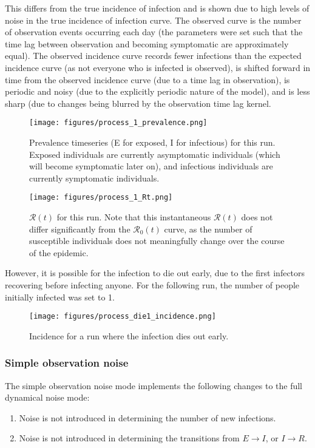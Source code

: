\documentclass{article}
\newcommand{\nR}{\mathcal{R}}
\begin{document}
This differs from the true incidence of infection and is shown due to high levels of noise in the true incidence of infection curve. The observed curve is the number of observation events occurring each day (the parameters were set such that the time lag between observation and becoming symptomatic are approximately equal). The observed incidence curve records fewer infections than the expected incidence curve (as not everyone who is infected is observed), is shifted forward in time from the observed incidence curve (due to a time lag in observation), is periodic and noisy (due to the explicitly periodic nature of the model), and is less sharp (due to changes being blurred by the observation time lag kernel. 

\clearpage
\begin{figure}[h!]
\centering
\texttt{[image: figures/process\_1\_prevalence.png]}
\caption{Prevalence timeseries (E for exposed, I for infectious) for this run. Exposed individuals are currently asymptomatic individuals (which will become symptomatic later on), and infectious individuals are currently symptomatic individuals.}
\end{figure}

\begin{figure}[h!]
\centering
\texttt{[image: figures/process\_1\_Rt.png]}
\caption{$\nR(t)$ for this run. Note that this instantaneous $\nR(t)$ does not differ significantly from the $\nR_0(t)$ curve, as the number of susceptible individuals does not meaningfully change over the course of the epidemic.}
\end{figure}

However, it is possible for the infection to die out early, due to the first infectors recovering before infecting anyone. For the following run, the number of people initially infected was set to 1.

\begin{figure}[h!]
\centering
\texttt{[image: figures/process\_die1\_incidence.png]}
\caption{Incidence for a run where the infection dies out early.}
\end{figure}

\clearpage
\subsubsection{Simple observation noise}
The simple observation noise mode implements the following changes to the full dynamical noise mode:
\begin{enumerate}
	\item Noise is not introduced in determining the number of new infections.
	\item Noise is not introduced in determining the transitions from $E \rightarrow I$, or $I \rightarrow R$. 
\end{enumerate}
\end{document}
